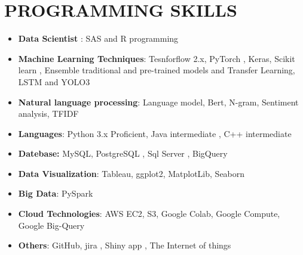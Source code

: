 \documentclass[letterpaper,11pt]{article}
\newcommand{\resumeSubHeadingListStart}{\begin{itemize}[leftmargin=*]}
\newcommand{\resumeSubHeadingListEnd}{\end{itemize}}
\begin{document}
\section{ \textbf{ PROGRAMMING SKILLS}}
  \resumeSubHeadingListStart
   \item{\textbf{Data Scientist }{: SAS and R programming }}
  \item{\textbf{Machine Learning Techniques}{: Tesnforflow 2.x, PyTorch , Keras, Scikit learn , Ensemble traditional and pre-trained models and Transfer Learning,  LSTM and YOLO3}}
    \item{\textbf{Natural language processing}{: Language model, Bert, N-gram, Sentiment analysis, TFIDF}}
    \item{\textbf{Languages}{: Python 3.x Proficient, Java intermediate , C++ intermediate}}
    \item{ \textbf{Datebase: }}{MySQL, PostgreSQL , Sql Server , BigQuery}
    \item{\textbf{Data Visualization}{: Tableau,  ggplot2, MatplotLib, Seaborn}}
      \item{\textbf{Big Data}{:  PySpark}}
      
      \item{\textbf{Cloud Technologies}{: AWS EC2, S3,  Google Colab, Google Compute, Google Big-Query }}
      \item {\textbf{Others}{: GitHub, jira , Shiny app , The Internet of things}}

  \resumeSubHeadingListEnd
\end{document}
